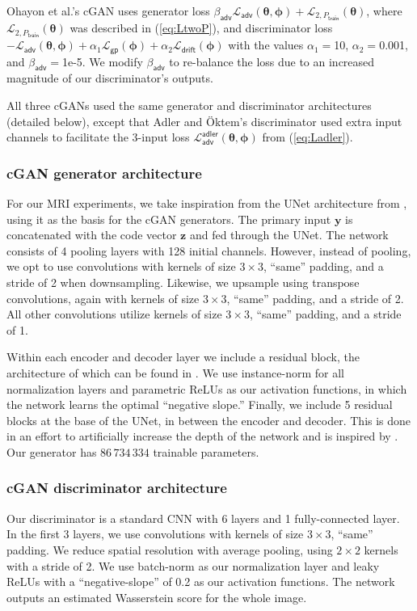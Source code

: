 \documentclass{article}
\theoremstyle{plain}
\theoremstyle{definition}
\theoremstyle{remark}
\renewcommand{\vec}[1]{\ensuremath{\boldsymbol{#1}}}
\newcommand{\mc}[1]{\ensuremath{\mathcal{#1}}}
\renewcommand{\eqref}[1]{(\ref{eq:#1})}
\newcommand{\train}{_{\mathsf{train}}}
\newcommand{\Ladler}{\mc{L}^{\mathsf{adler}}_{\mathsf{adv}}}
\newcommand{\Ladv}{\mc{L}_{\mathsf{adv}}}
\newcommand{\Lgp}{\mc{L}_{\mathsf{gp}}}
\newcommand{\Ldrift}{\mc{L}_{\mathsf{drift}}}
\newcommand{\LtwoPt}{\mc{L}_{2,P\train}}
\newcommand{\betaadv}{\beta_{\mathsf{adv}}}
\begin{document}
Ohayon et al.'s cGAN \cite{Ohayon:ICCVW:21} uses generator loss $\betaadv\Ladv(\vec{\theta},\vec{\phi}) + \LtwoPt(\vec{\theta})$, where $\LtwoPt(\vec{\theta})$ was described in \eqref{LtwoP}, and discriminator loss $-\Ladv(\vec{\theta},\vec{\phi})+ \alpha_1 \Lgp(\vec{\phi}) + \alpha_2 \Ldrift(\vec{\phi})$
with the values $\alpha_1=$10, $\alpha_2=$0.001, and $\betaadv=$1e-5. We modify $\betaadv$ to re-balance the loss due to an increased magnitude of our discriminator's outputs.

All three cGANs used the same generator and discriminator architectures (detailed below), except that Adler and \"Oktem's discriminator used extra input channels to facilitate the 3-input loss $\Ladler(\vec{\theta},\vec{\phi})$ from \eqref{Ladler}.

\subsubsection{cGAN generator architecture} 
For our MRI experiments, we take inspiration from the UNet architecture from \cite{Ronneberger:MICCAI:15}, using it as the basis for the cGAN generators. 
The primary input $\vec{y}$ is concatenated with the code vector $\vec{z}$ and fed through the UNet. 
The network consists of 4 pooling layers with 128 initial channels.
However, instead of pooling, we opt to use convolutions with kernels of size $3\times3$, ``same'' padding, and a stride of 2 when downsampling. 
Likewise, we upsample using transpose convolutions, again with kernels of size $3\times3$, ``same'' padding, and a stride of 2.
All other convolutions utilize kernels of size $3\times3$, ``same'' padding, and a stride of 1.

Within each encoder and decoder layer we include a residual block, the architecture of which can be found in \cite{Adler:18}.
We use instance-norm for all normalization layers and parametric ReLUs as our activation functions, in which the network learns the optimal ``negative slope.''
Finally, we include 5 residual blocks at the base of the UNet, in between the encoder and decoder. This is done in an effort to artificially increase the depth of the network and is inspired by \cite{Deora:CVPRW:20}.
Our generator has $86\,734\,334$ trainable parameters.

\subsubsection{cGAN discriminator architecture} 
Our discriminator is a standard CNN with 6 layers and 1 fully-connected layer. 
In the first 3 layers, we use convolutions with kernels of size $3\times3$, ``same'' padding. We reduce spatial resolution with average pooling, using $2\times2$ kernels with a stride of 2. 
We use batch-norm as our normalization layer and leaky ReLUs with a ``negative-slope'' of 0.2 as our activation functions. The network outputs an estimated Wasserstein score for the whole image.
\end{document}
